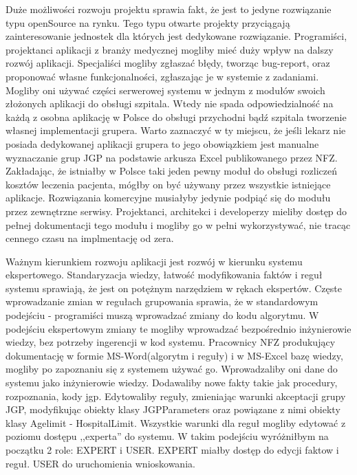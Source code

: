 Duże możliwości rozwoju projektu sprawia fakt, że jest to jedyne rozwiązanie typu openSource na rynku. Tego typu otwarte projekty przyciągają zainteresowanie jednostek dla których jest dedykowane rozwiązanie. Programiści, projektanci aplikacji z branży medycznej mogliby mieć duży wpływ na dalszy rozwój aplikacji. Specjaliści mogliby zgłaszać błędy, tworząc bug-report, oraz proponować własne funkcjonalności, zgłaszając je w systemie z zadaniami. Mogliby oni używać części serwerowej systemu w jednym z modułów swoich złożonych aplikacji do obsługi szpitala. Wtedy nie spada odpowiedzialność na każdą z osobna aplikację w Polsce do obsługi przychodni bądź szpitala tworzenie własnej implementacji grupera. Warto zaznaczyć w ty miejscu, że jeśli lekarz nie posiada dedykowanej aplikacji grupera to jego obowiązkiem jest manualne wyznaczanie grup JGP na podstawie arkusza Excel publikowanego przez NFZ. 
Zakładając, że istniałby w Polsce taki jeden pewny moduł do obsługi rozliczeń kosztów leczenia pacjenta, mógłby on być używany przez wszystkie istniejące aplikacje. Rozwiązania komercyjne musiałyby jedynie podpiąć się do modułu przez zewnętrzne serwisy. Projektanci, architekci i developerzy mieliby dostęp do pełnej dokumentacji tego modułu i mogliby go w pełni wykorzystywać, nie tracąc cennego czasu na implmentację od zera.

Ważnym kierunkiem rozwoju aplikacji jest rozwój w kierunku systemu ekspertowego. Standaryzacja wiedzy, łatwość modyfikowania faktów i reguł systemu sprawiają, że jest on potężnym narzędziem w rękach ekspertów. Częste wprowadzanie zmian w regułach grupowania sprawia, że w standardowym podejściu - programiści muszą wprowadzać zmiany do kodu algorytmu. W podejściu ekspertowym zmiany te mogliby wprowadzać bezpośrednio inżynierowie wiedzy, bez potrzeby ingerencji w kod systemu. Pracownicy NFZ produkujący dokumentację w formie MS-Word(algorytm i reguły) i w MS-Excel bazę wiedzy, mogliby po zapoznaniu się z systemem używać go. Wprowadzaliby oni dane do systemu jako inżynierowie wiedzy. Dodawaliby nowe fakty takie jak procedury, rozpoznania, kody jgp. Edytowaliby reguły, zmieniając warunki akceptacji grupy JGP, modyfikując obiekty klasy JGPParameters oraz powiązane z nimi obiekty klasy Agelimit - HospitalLimit. Wszystkie warunki dla reguł mogliby edytować z poziomu dostępu ,,experta'' do systemu.
W takim podejściu wyróżniłbym na początku 2 role: EXPERT i USER. EXPERT miałby dostęp do edycji faktow i reguł. USER do uruchomienia wnioskowania.

